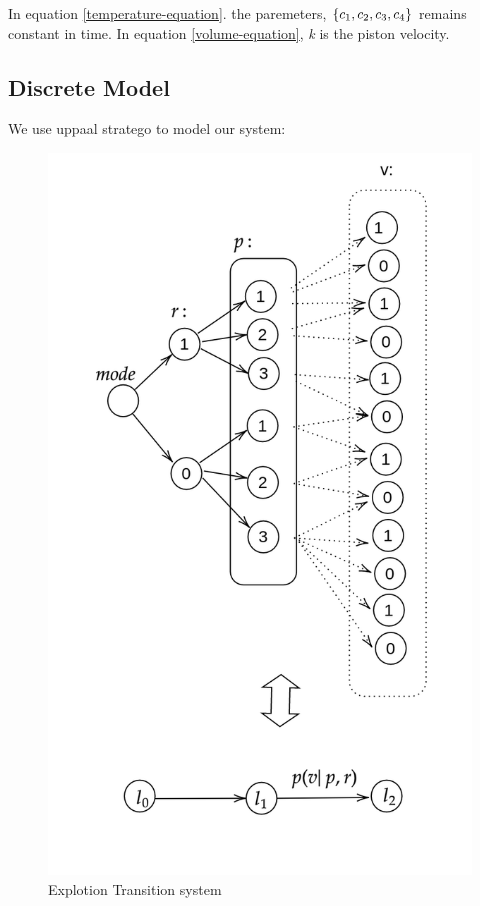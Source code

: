 \documentclass[conference]{IEEEtran}
\begin{document}
In equation \ref{temperature-equation}. the paremeters,  $\left\lbrace 
c_1, c_{2}, c_{3}, c_{4} \right\rbrace $ 
remains constant in time. In equation \ref{volume-equation}, 
\emph{k} is the piston velocity.


\subsection{Discrete Model}

We use uppaal stratego to model our system:

\begin{figure}[h]  %
  \includegraphics[scale = 0.25]{4}
  \caption{Explotion Transition system}
  \centering
\end{figure}
\end{document}
